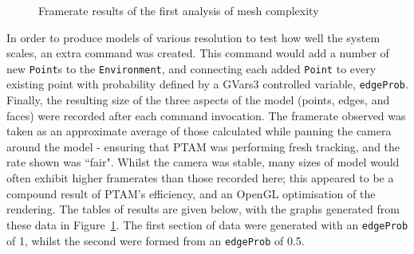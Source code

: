 \documentclass[a4paper,10pt]{report}
\begin{document}
\begin{figure}
  \begin{center}
    \hspace{10px}
  \end{center}
  \caption{Framerate results of the first analysis of mesh complexity}
  \label{framerate}
\end{figure} 

In order to produce models of various resolution to test how well the system scales, an extra command was created. This command would add a number of new \texttt{Point}s to the \texttt{Environment}, and connecting each added \texttt{Point} to every existing point with probability defined by a GVars3 controlled variable, \texttt{edgeProb}. Finally, the resulting size of the three aspects of the model (points, edges, and faces) were recorded after each command invocation. The framerate observed was taken as an approximate average of those calculated while panning the camera around the model - ensuring that PTAM was performing fresh tracking, and the rate shown was ``fair". Whilst the camera was stable, many sizes of model would often exhibit higher framerates than those recorded here; this appeared to be a compound result of PTAM's efficiency, and an OpenGL optimisation of the rendering. The tables of results are given below, with the graphs generated from these data in Figure~\ref{framerate}. The first section of data were generated with an \texttt{edgeProb} of 1, whilst the second were formed from an \texttt{edgeProb} of 0.5.
\end{document}
